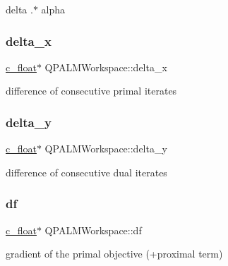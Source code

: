 delta .$\ast$ alpha 

\mbox{\label{structQPALMWorkspace_a84a2e58667872450dd7de728e98d8532}} 
\subsubsection{\texorpdfstring{delta\_x}{delta\_x}}
{\footnotesize\ttfamily \mbox{\hyperlink{global__opts_8h_a7f1a9fda95e52979658c20a0d134fb15}{c\+\_\+float}}$\ast$ Q\+P\+A\+L\+M\+Workspace\+::delta\+\_\+x}



difference of consecutive primal iterates 

\mbox{\label{structQPALMWorkspace_a0454fc1ea5ab776f3cd0a2a4856220e8}} 
\subsubsection{\texorpdfstring{delta\_y}{delta\_y}}
{\footnotesize\ttfamily \mbox{\hyperlink{global__opts_8h_a7f1a9fda95e52979658c20a0d134fb15}{c\+\_\+float}}$\ast$ Q\+P\+A\+L\+M\+Workspace\+::delta\+\_\+y}



difference of consecutive dual iterates 

\mbox{\label{structQPALMWorkspace_aca74b2322e2dc5427a440a39a16e2c3b}} 
\subsubsection{\texorpdfstring{df}{df}}
{\footnotesize\ttfamily \mbox{\hyperlink{global__opts_8h_a7f1a9fda95e52979658c20a0d134fb15}{c\+\_\+float}}$\ast$ Q\+P\+A\+L\+M\+Workspace\+::df}



gradient of the primal objective (+proximal term) 

\mbox{\label{structQPALMWorkspace_abc9bf36aa5174f0e7839630d9bef826b}} 
